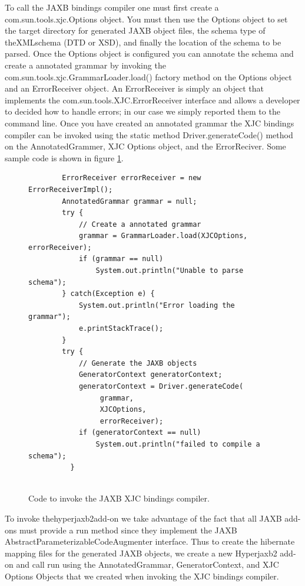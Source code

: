 To call the JAXB bindings compiler one must first create a com.sun.tools.xjc.Options object.  You must then use the Options object to set the target directory for generated JAXB object files, the schema type of theXMLschema (DTD or XSD), and finally the location of the schema to be parsed.  Once the Options object is configured you can annotate the schema and create a annotated grammar by invoking the com.sun.tools.xjc.GrammarLoader.load()  factory method on the Options object and an ErrorReceiver object.  An ErrorReceiver is simply an object that implements the com.sun.tools.XJC.ErrorReceiver interface and allows a developer to decided how to handle errors;  in our case we simply reported them to the command line.   Once you have created an annotated grammar the XJC bindings compiler can be invoked using the static method Driver.generateCode() method on the AnnotatedGrammer, XJC Options object, and the ErrorReciver.  Some sample code is shown in figure \ref{XJCsamplecode}.
\begin{figure}[htbp]
\begin{center}
\begin{verbatim}     
        ErrorReceiver errorReceiver = new ErrorReceiverImpl();
        AnnotatedGrammar grammar = null;
        try {
            // Create a annotated grammar
            grammar = GrammarLoader.load(XJCOptions, errorReceiver);
            if (grammar == null)
                System.out.println("Unable to parse schema");
        } catch(Exception e) {
            System.out.println("Error loading the grammar");
            e.printStackTrace(); 
        }
        try {
            // Generate the JAXB objects
            GeneratorContext generatorContext;
            generatorContext = Driver.generateCode(
                 grammar, 
                 XJCOptions, 
                 errorReceiver);
            if (generatorContext == null)
                System.out.println("failed to compile a schema");
          }
        
\end{verbatim}

\caption{Code to invoke the JAXB XJC bindings compiler.}
\label{XJCsamplecode}
\end{center}
\end{figure}

To invoke thehyperjaxb2add-on we take advantage of the fact that all JAXB add-ons must provide a run method since they implement the JAXB AbstractParameterizableCodeAugmenter interface.  Thus to create the hibernate mapping files for the generated JAXB objects, we create a new Hyperjaxb2 add-on and call run using the AnnotatedGrammar, GeneratorContext,  and XJC Options Objects that we created when invoking the XJC bindings compiler. 

